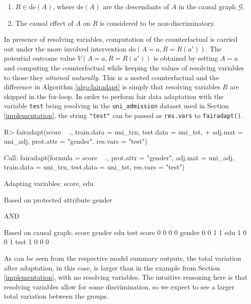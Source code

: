 \documentclass[
  nojss]{jss}
\providecommand{\tightlist}{%
  \setlength{\itemsep}{0pt}\setlength{\parskip}{0pt}}
\begin{document}
\begin{enumerate}
\def\labelenumi{(\roman{enumi})}
\tightlist
\item
  \(R \in \mathrm{de}(A)\), where \(\mathrm{de}(A)\) are the descendants
  of \(A\) in the causal graph \(\mathcal{G}\).
\item
  The causal effect of \(A\) on \(R\) is considered to be
  non-discriminatory.
\end{enumerate}

In presence of resolving variables, computation of the counterfactual is
carried out under the more involved intervention
do\((A = a, R = R(a'))\). The potential outcome value
\(V(A = a, R = R(a'))\) is obtained by setting \(A = a\) and computing
the counterfactual while keeping the values of resolving variables to
those they \emph{attained naturally}. This is a nested counterfactual
and the difference in Algorithm \ref{algo:fairadapt} is simply that
resolving variables \(R\) are skipped in the for-loop. In order to
perform fair data adaptation with the variable \texttt{test} being
resolving in the \texttt{uni\_admission} dataset used in Section
\ref{implementation}, the string \texttt{"test"} can be passed as
\texttt{res.vars} to \texttt{fairadapt()}.

\begin{CodeChunk}
\begin{CodeInput}
R> fairadapt(score ~ ., train.data = uni_trn, test.data = uni_tst,
+           adj.mat = uni_adj, prot.attr = "gender", res.vars = "test")
\end{CodeInput}
\begin{CodeOutput}

Call:
fairadapt(formula = score ~ ., prot.attr = "gender", adj.mat = uni_adj, 
    train.data = uni_trn, test.data = uni_tst, res.vars = "test")


Adapting variables:
  score, edu

Based on protected attribute gender 

  AND

Based on causal graph:
       score gender edu test
score      0      0   0    0
gender     0      0   1    1
edu        1      0   0    1
test       1      0   0    0
\end{CodeOutput}
\end{CodeChunk}

As can be seen from the respective model summary outputs, the total
variation after adaptation, in this case, is larger than in the example
from Section \ref{implementation}, with no resolving variables. The
intuitive reasoning here is that resolving variables allow for some
discrimination, so we expect to see a larger total variation between the
groups.
\end{document}
